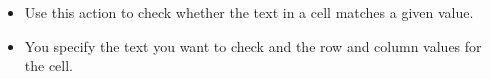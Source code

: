 \begin{itemize}
\item Use this action to check whether the text in a cell matches a given value.
\item You specify the text you want to check and the row and column values for the cell.
\end{itemize}

